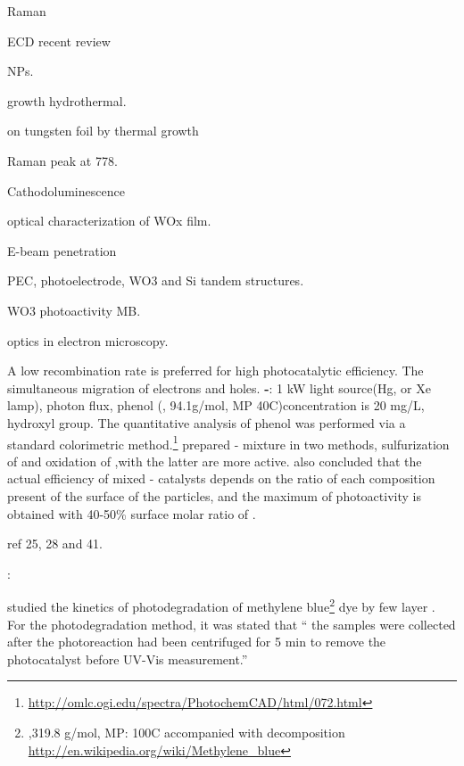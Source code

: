    Raman \cite{Guo2012} \cite{Guo2011}

  ECD \cite{Jiao2012} recent review \cite{Mortimer2011}

   NPs. \cite{Frey2001}

   growth hydrothermal.\cite{Moshofsky2012}

   on tungsten foil by thermal growth\cite{VanHieu2012}

   Raman peak at 778. \cite{Deb2007}

  Cathodoluminescence \cite{Parish2007}

  optical characterization of WOx film.\cite{Valyukh2010a}

  E-beam penetration \cite{Kanaya2002}

  PEC, photoelectrode, WO3 and Si tandem structures.\cite{Coridan2013}

  WO3 photoactivity MB. \cite{Watcharenwong2008}

  optics in electron microscopy. \cite{GarciadeAbajo2010a}

  A low recombination rate is preferred for high photocatalytic efficiency. The simultaneous migration of electrons and holes.
\textbf{-}: 1 kW light source(Hg, or Xe lamp), photon flux, phenol (, 94.1g/mol, MP 40C)concentration is 20 mg/L, hydroxyl group. The quantitative analysis of phenol was performed via a standard colorimetric method.\footnote{\url{http://omlc.ogi.edu/spectra/PhotochemCAD/html/072.html}}
\citeauthor{DiPaola1999} prepared - mixture in two methods, sulfurization of  and oxidation of ,with the latter are more active.
\citeauthor{DiPaola1999} also concluded that the actual efficiency of mixed - catalysts depends on the ratio of each composition present of the surface of the particles, and the maximum of photoactivity is obtained with 40-50\% surface molar ratio of .

ref 25, 28 and 41.

\textbf{}:

\citeauthor{Sreedhara2013} studied the kinetics of photodegradation of methylene blue\footnote{,319.8 g/mol, MP: 100C accompanied with decomposition \url{http://en.wikipedia.org/wiki/Methylene_blue}} dye by few layer .
For the photodegradation method, it was stated that `` the samples were collected after the photoreaction had been centrifuged for 5 min to remove the photocatalyst before UV-Vis measurement.''


